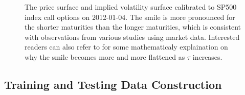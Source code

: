 \documentclass[letterpaper,12pt,titlepage,oneside,final]{book}
\numberwithin{equation}{section}
\theoremstyle{definition}
\begin{document}
\begin{figure}[htp!]
	\centering
	\caption{The price surface and implied volatility surface calibrated to SP500 index call options on 2012-01-04. The smile is more pronounced for the shorter maturities than the longer maturities, which is consistent with observations from various studies \cite{chance2017bias,rogers2010can} using market data. Interested readers can also refer to \cite{rogers2010can} for some mathematicaly explaination on why the smile becomes more and more flattened as $\tau$ increases.}
	\label{fig:CaliExp}
\end{figure}



\subsection{Training and Testing Data Construction}
\label{sec:Augtrain}
\end{document}
